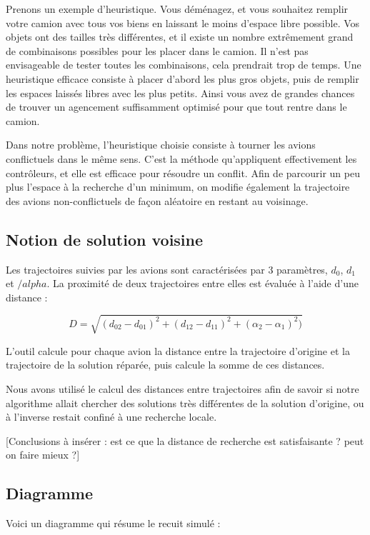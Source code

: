 Prenons un exemple d'heuristique. Vous déménagez, et vous souhaitez remplir votre camion avec tous vos biens en laissant le moins d'espace libre possible. Vos objets ont des tailles très différentes, et il existe un nombre extrêmement grand de combinaisons possibles pour les placer dans le camion. Il n'est pas envisageable de tester toutes les combinaisons, cela prendrait trop de temps. Une heuristique efficace consiste à placer d'abord les plus gros objets, puis de remplir les espaces laissés libres avec les plus petits. Ainsi vous avez de grandes chances de trouver un agencement suffisamment optimisé pour que tout rentre dans le camion.

Dans notre problème, l'heuristique choisie consiste à tourner les avions conflictuels dans le même sens. C'est la méthode qu'appliquent effectivement les contrôleurs, et elle est efficace pour résoudre un conflit. Afin de parcourir un peu plus l'espace à la recherche d'un minimum, on modifie également la trajectoire des avions non-conflictuels de façon aléatoire en restant au voisinage.

\subsection*{Notion de solution voisine}

Les trajectoires suivies par les avions sont caractérisées par 3 paramètres, $d_0$, $d_1$ et $/alpha$. La proximité de deux trajectoires entre elles est évaluée à l'aide d'une distance :

\begin{equation}
D = \sqrt{(d_{02}-d_{01})^2 + (d_{12}-d_{11})^2 + (\alpha_2-\alpha_1)^2)}
\end{equation}

L'outil calcule pour chaque avion la distance entre la trajectoire d'origine et la trajectoire de la solution réparée, puis calcule la somme de ces distances.

Nous avons utilisé le calcul des distances entre trajectoires afin de savoir si notre algorithme allait chercher des solutions très différentes de la solution d'origine, ou à l'inverse restait confiné à une recherche locale. 

[Conclusions à insérer : est ce que la distance de recherche est satisfaisante ? peut on faire mieux ?]

\subsection*{Diagramme}

Voici un diagramme qui résume le recuit simulé : \\


